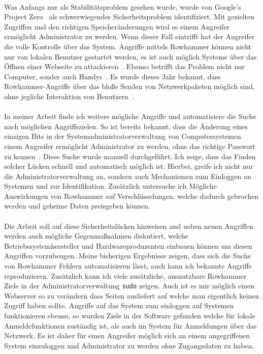 \documentclass[a4paper]{article}
\begin{document}
\paragraph{}

Was Anfangs nur als Stabilitätsproblem gesehen wurde, wurde von Google's Project
Zero~\cite{projectzerorow} als schwerwiegendes Sicherheitsproblem identifiziert.
Mit gezielten Zugriffen und den richtigen Speicheränderungen wird es einem 
Angreifer ermöglicht Administrator zu werden. Wenn dieser Fall eintrifft hat
der Angreifer die volle Kontrolle über das System. Angriffe mittels Rowhammer
können nicht nur von lokalen Benutzer gestartet werden, es ist auch möglich
Systeme über das Öffnen einer Webseite zu attackieren~\cite{rowhammerjs}.
Ebenso betrifft das Problem nicht nur Computer, sonder auch
Handys~\cite{drammer}. Es wurde dieses Jahr bekannt, dass Rowhammer-Angriffe 
über das bloße Senden von Netzwerkpaketen möglich sind, ohne jegliche
Interaktion von Benutzern~\cite{nethammer}. 

\paragraph{}

In meiner Arbeit finde ich weitere mögliche Angriffe und automatisiere die Suche
nach möglichen Angriffszielen. So ist bereits bekannt, dass die Änderung
eines einzigen Bits in der Systemadministratorverwaltung von Computersystemen
einem Angreifer ermöglicht Administrator zu werden, ohne das
richtige Passwort zu kennen~\cite{flipinthewall}. Diese Suche wurde manuell
durchgeführt. Ich zeige, dass das Finden solcher Lücken schnell und 
automatisch möglich ist. Hierbei, greife ich nicht nur die
Administratorverwaltung an, sondern auch Mechanismen zum Einloggen an Systemen
und zur Identifikation. Zusätzlich untersuche ich Mögliche Auswirkungen von 
Rowhammer auf  Verschlüsselungen, welche dadurch gebrochen werden und geheime
Daten preisgeben können.

\paragraph{}

Die Arbeit soll auf diese Sicherheitslücken hinweisen und neben neuen Angriffen
werden auch mögliche Gegenmaßnahmen diskutiert, welche Betriebssystemhersteller
und Hardwareproduzenten einbauen können um diesen Angriffen vorzubeugen.
Meine bisherigen Ergebnisse zeigen, dass sich die Suche von Rowhammer Fehlern
automatisieren lässt, auch kann ich bekannte Angriffe reproduzieren. Zusätzlich
kann ich viele zusätzliche, ausnutzbare Rowhammer Ziele in der 
Administratorverwaltung \texttt{sudo} zeigen. Auch ist es mir möglich einen 
Webserver so zu verändern dass Seiten ausliefert auf welche man eigentlich
keinen Zugriff haben sollte. Angriffe auf das System zum einloggen auf Systemen
funktionieren ebenso, so wurden Ziele in der Software gefunden welche für lokale
Anmeldefunktionen zuständig ist, als auch im System für Anmeldungen über das
Netzwerk. Es ist daher für einen Angreifer möglich sich an einem angegriffenen 
System einzuloggen und Administrator zu werden ohne Zugangsdaten zu haben.

\pagebreak



\end{document}
